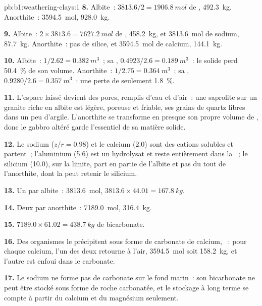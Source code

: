 \begin{solution}{pb:b1:weathering-clays:1}
\textbf{8.} Albite~: $3813.6/2 = \qty{1906.8}{mol}$ de ,
\qty{492.3}{kg}. Anorthite~: \qty{3594.5}{mol}, \qty{928.0}{kg}.

\textbf{9.} Albite~: $2\times3813.6 = \qty{7627.2}{mol}$ de ,
\qty{458.2}{kg}, et \qty{3813.6}{mol} de sodium, \qty{87.7}{kg}. Anorthite~:
pas de silice, et \qty{3594.5}{mol} de calcium, \qty{144.1}{kg}.

\textbf{10.} Albite~: $1/2.62 = \qty{0.382}{m^3}$~; sa ,
$0.4923/2.6 = \qty{0.189}{m^3}$~: le solide perd \qty{50.4}{\percent} de son
volume. Anorthite~: $1/2.75 = \qty{0.364}{m^3}$~; sa ,
$0.9280/2.6 = \qty{0.357}{m^3}$~: une perte de seulement \qty{1.8}{\percent}.

\textbf{11.} L'espace laissé devient des pores, remplis d'eau et d'air~: une
saprolite sur un granite riche en albite est légère, poreuse et friable, ses grains de quartz
libres dans un peu d'argile. L'anorthite se transforme en presque son propre volume de
, donc le gabbro altéré garde l'essentiel de sa matière solide.

\textbf{12.} Le sodium ($z/r = 0.98$) et le calcium (2.0) sont des cations solubles et
partent~; l'aluminium (5.6) est un hydrolysat et reste entièrement dans la ~;
le silicium (10.0), sur la limite, part en partie de l'albite et pas du tout
de l'anorthite, dont la  peut retenir le silicium.

\textbf{13.} Un  par albite~: \qty{3813.6}{mol}, $3813.6 \times 44.01 =
\qty{167.8}{kg}$.

\textbf{14.} Deux par anorthite~: \qty{7189.0}{mol}, \qty{316.4}{kg}.

\textbf{15.} $7189.0 \times 61.02 = \qty{438.7}{kg}$ de bicarbonate.

\textbf{16.} Des organismes le précipitent sous forme de carbonate de calcium,
~: pour chaque calcium, l'un des deux
 retourne à l'air, \qty{3594.5}{mol} soit \qty{158.2}{kg}, et
l'autre est enfoui dans le carbonate.

\textbf{17.} Le sodium ne forme pas de carbonate sur le fond marin~: son bicarbonate
ne peut être stocké sous forme de roche carbonatée, et le stockage à long terme se compte à partir du
calcium et du magnésium seulement.


\end{solution}
